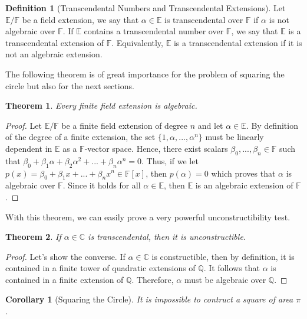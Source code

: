 \documentclass{article}
\theoremstyle{plain}
\newtheorem{theorem}{Theorem}[subsection]
\newtheorem*{corollary}{Corollary}
\theoremstyle{definition}
\newtheorem*{definition}{Definition}
\newcommand{\C}{\mathbb{C}}
\newcommand{\Q}{\mathbb{Q}}
\newcommand{\F}{\mathbb{F}}
\newcommand{\E}{\mathbb{E}}
\begin{document}
\begin{definition}[Transcendental Numbers and Transcendental Extensions]
    Let $\E / \F$ be a field extension, we say that $\alpha \in \E$ is transcendental over $\F$ if $\alpha$ is not algebraic over $\F$. If $\E$ contains a transcendental number over $\F$, we say that $\E$ is a transcendental extension of $\F$. Equivalently, $\E$ is a transcendental extension if it is not an algebraic extension. 
\end{definition}

The following theorem is of great importance for the problem of squaring the circle but also for the next sections.

\begin{theorem}
\label{finite implies algebraic}
    Every finite field extension is algebraic.
\end{theorem}

\begin{proof}
    Let $\E / \F$ be a finite field extension of degree $n$ and let $\alpha \in \E$. By definition of the degree of a finite extension, the set $\{1, \alpha, ..., \alpha^n\}$ must be linearly dependent in $\E$ as a $\F$-vector space. Hence, there exist scalars $\beta_0, ..., \beta_n \in \F$ such that $\beta_0 + \beta_1 \alpha + \beta_2 \alpha^2 +  ... + \beta_n \alpha^n = 0$. Thus, if we let $p(x) = \beta_0 + \beta_1 x +  ... + \beta_n x^n \in \F[x]$, then $p(\alpha) = 0$ which proves that $\alpha$ is algebraic over $\F$. Since it holds for all $\alpha \in \E$, then $\E$ is an algebraic extension of $\F$.
\end{proof}

With this theorem, we can easily prove a very powerful unconstructibility test.

\begin{theorem}
\label{transcendental implies unconstructible}
    If $\alpha \in \C$ is transcendental, then it is unconstructible.
\end{theorem}

\begin{proof}
    Let's show the converse. If $\alpha \in \C$ is constructible, then by definition, it is contained in a finite tower of quadratic extensions of $\Q$. It follows that $\alpha$ is contained in a finite extension of $\Q$. Therefore, $\alpha$ must be algebraic over $\Q$.
\end{proof}

\begin{corollary}[Squaring the Circle]
    It is impossible to contruct a square of area $\pi$.
\end{corollary}
\end{document}
